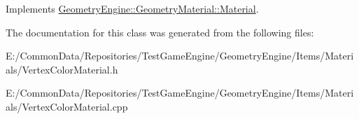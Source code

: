 Implements \mbox{\hyperlink{class_geometry_engine_1_1_geometry_material_1_1_material_a68310797df53062f237d0005fbcfce7e}{Geometry\+Engine\+::\+Geometry\+Material\+::\+Material}}.



The documentation for this class was generated from the following files\+:\begin{DoxyCompactItemize}
\item 
E\+:/\+Common\+Data/\+Repositories/\+Test\+Game\+Engine/\+Geometry\+Engine/\+Items/\+Materials/Vertex\+Color\+Material.\+h\item 
E\+:/\+Common\+Data/\+Repositories/\+Test\+Game\+Engine/\+Geometry\+Engine/\+Items/\+Materials/Vertex\+Color\+Material.\+cpp\end{DoxyCompactItemize}
